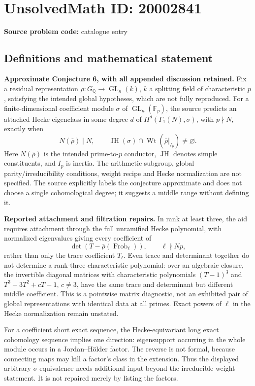 \documentclass[11pt]{article}
\newcommand{\Q}{\mathbb{Q}}
\newcommand{\F}{\mathbb{F}}
\begin{document}
\section*{UnsolvedMath ID: 20002841}
\textbf{Source problem code:} catalogue entry
\subsection{Definitions and mathematical statement}
\textbf{Approximate Conjecture 6, with all appended discussion retained.} Fix a residual representation \(\bar\rho:G_\Q\to\operatorname{GL}_n(k)\), \(k\) a splitting field of characteristic \(p\), satisfying the intended global hypotheses, which are not fully reproduced. For a finite-dimensional coefficient module \(\sigma\) of \(\operatorname{GL}_n(\F_p)\), the source predicts an attached Hecke eigenclass in some degree \(d\) of \(H^d(\Gamma_1(N),\sigma)\), with \(p\nmid N\), exactly when
\[
 N(\bar\rho)\mid N,\qquad
 \operatorname{JH}(\sigma)\cap\operatorname{Wt}(\bar\rho|_{I_p})\ne\varnothing.
\]
Here \(N(\bar\rho)\) is the intended prime-to-\(p\) conductor, \(\operatorname{JH}\) denotes simple constituents, and \(I_p\) is inertia. The arithmetic subgroup, global parity/irreducibility conditions, weight recipe and Hecke normalization are not specified. The source explicitly labels the conjecture approximate and does not choose a single cohomological degree; it suggests a middle range without defining it.

\textbf{Reported attachment and filtration repairs.} In rank at least three, the aid requires attachment through the full unramified Hecke polynomial, with normalized eigenvalues giving every coefficient of
\[
 \det(T-\bar\rho(\operatorname{Frob}_\ell)),\qquad\ell\nmid Np,
\]
rather than only the trace coefficient \(T_\ell\). Even trace and determinant together do not determine a rank-three characteristic polynomial: over an algebraic closure, the invertible diagonal matrices with characteristic polynomials \((T-1)^3\) and \(T^3-3T^2+cT-1\), \(c\ne3\), have the same trace and determinant but different middle coefficient. This is a pointwise matrix diagnostic, not an exhibited pair of global representations with identical data at all primes. Exact powers of \(\ell\) in the Hecke normalization remain unstated.

For a coefficient short exact sequence, the Hecke-equivariant long exact cohomology sequence implies one direction: eigensupport occurring in the whole module occurs in a Jordan--H\"older factor. The reverse is not formal, because connecting maps may kill a factor's class in the extension. Thus the displayed arbitrary-\(\sigma\) equivalence needs additional input beyond the irreducible-weight statement. It is not repaired merely by listing the factors.
\end{document}
